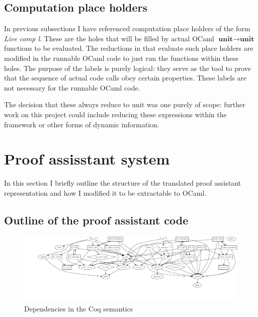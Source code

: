 \documentclass[12pt,twoside,notitlepage]{report}
\begin{document}
\subsection{Computation place holders}
In previous subsections I have referenced computation place holders of the form \textit{Live comp l}. These are the holes that will be filled by actual OCaml $ \textbf{unit} \rightarrow \textbf{unit} $ functions to be evaluated. The reductions in  that evaluate such place holders are modified in the runnable OCaml code to just run the functions within these holes. The purpose of the labels is purely logical: they serve as the tool to prove that the sequence of actual code calls obey certain properties. These labels are not necessary for the runnable OCaml code.

The decision that these always reduce to unit was one purely of scope: further work on this project could include reducing these expressions within the framework or other forms of dynamic information. \clearpage
\section{Proof assisstant system}
In this section I briefly outline the structure of the translated proof assistant representation and how I modified it to be extractable to OCaml. 
\subsection{Outline of the proof assistant code}

\begin{figure}
\centering
\includegraphics[width=\linewidth]{coqBaseStruct.pdf}
\caption{Dependencies in the Coq semantics}
\label{fig:coqBaseStruct}
\end{figure}
\end{document}
